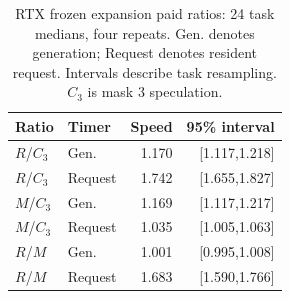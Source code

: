 \begin{table}[ht]\centering\small
\caption{RTX frozen expansion paid ratios: 24 task medians, four repeats. Gen. denotes generation; Request denotes resident request. Intervals describe task resampling. $C_3$ is mask 3 speculation.}\label{tab:rtx_cost}
\setlength{\tabcolsep}{4pt}
\begin{tabular}{@{}llrr@{}}\toprule
Ratio & Timer & Speed & 95\% interval\\\midrule
$R$/$C_3$ & Gen. & 1.170 & [1.117,1.218]\\
$R$/$C_3$ & Request & 1.742 & [1.655,1.827]\\
$M$/$C_3$ & Gen. & 1.169 & [1.117,1.217]\\
$M$/$C_3$ & Request & 1.035 & [1.005,1.063]\\
$R$/$M$ & Gen. & 1.001 & [0.995,1.008]\\
$R$/$M$ & Request & 1.683 & [1.590,1.766]\\
\bottomrule\end{tabular}

\end{table}
